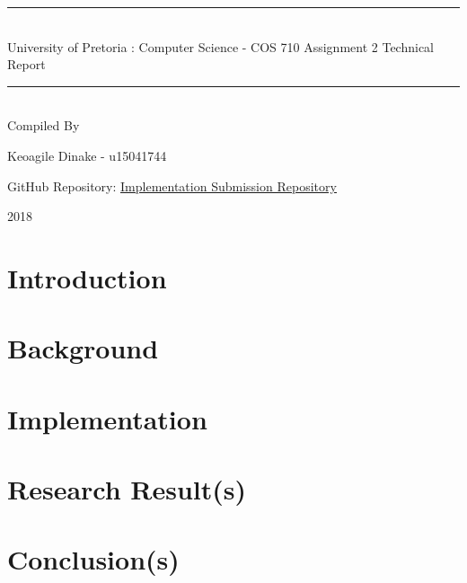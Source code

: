 \documentclass{article}
\newcommand*{\titleGP}{
	\begingroup
	
		\rule{\textwidth}{0.4pt}\vspace*{-\baselineskip}\vspace*{2pt}
		\\[\baselineskip]

		{\LARGE University of Pretoria : Computer Science - COS 710 Assignment 2 Technical Report} 
		\\ [0.2\baselineskip]
	
		\rule{\textwidth}{0.4pt}\vspace*{-\baselineskip}\vspace{3.2pt}
		\\[\baselineskip]

		Compiled By 
		\\[\baselineskip]	
		{\Large Keoagile Dinake - u15041744 \par}
		\bigskip
		\bigskip 	
 		GitHub Repository:
 		\href{https://www.github.com/kmdinake/le-creyol}{\underline{Implementation Submission Repository} }

		\vfill
		{\scshape 2018} 
		\\[0.3\baselineskip]

	\endgroup
}
\begin{document}
	\titleGP
	\newpage
	\tableofcontents
	\section{Introduction}
	
	\section{Background}
	
	\section{Implementation}
	
	\section{Research Result(s)}
	
	\section{Conclusion(s)}
	
\end{document}
